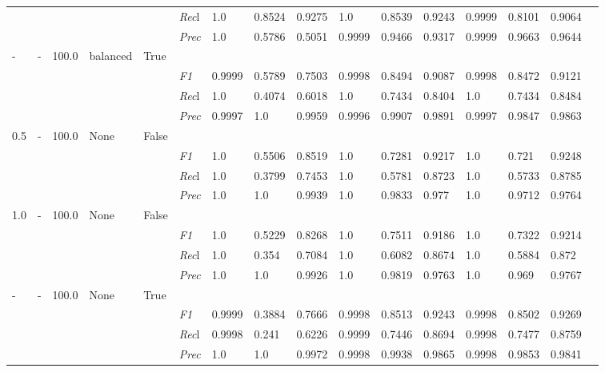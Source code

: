 \begin{table}[]
\begin{tabularx}{\textwidth}{XXXXX|X|XXX|XXX|XXXX}
& & & & & \textit{Rec}l & 1.0 & 0.8524 & 0.9275    & 1.0 & 0.8539    & 0.9243    & 0.9999    & 0.8101    & 0.9064    \\
& & & & & \textit{Prec} & 1.0 & 0.5786 & 0.5051 & 0.9999 & 0.9466 & 0.9317 & 0.9999 & 0.9663 & 0.9644 \\ \midrule
- & - & 100.0 & balanced & True& & & & & & & & & \\
& & & & & \textit{F1} & 0.9999 & 0.5789 & 0.7503 & 0.9998 & 0.8494        & 0.9087        & 0.9998        & 0.8472        & 0.9121        \\
& & & & & \textit{Rec}l & 1.0 & 0.4074 & 0.6018    & 1.0 & 0.7434    & 0.8404    & 1.0    & 0.7434    & 0.8484    \\
& & & & & \textit{Prec} & 0.9997 & 1.0 & 0.9959 & 0.9996 & 0.9907 & 0.9891 & 0.9997 & 0.9847 & 0.9863 \\ \midrule
0.5 & - & 100.0 & None & False& & & & & & & & & \\
& & & & & \textit{F1} & 1.0 & 0.5506 & 0.8519 & 1.0 & 0.7281        & 0.9217        & 1.0        & 0.721        & 0.9248        \\
& & & & & \textit{Rec}l & 1.0 & 0.3799 & 0.7453    & 1.0 & 0.5781    & 0.8723    & 1.0    & 0.5733    & 0.8785    \\
& & & & & \textit{Prec} & 1.0 & 1.0 & 0.9939 & 1.0 & 0.9833 & 0.977 & 1.0 & 0.9712 & 0.9764 \\ \midrule
1.0 & - & 100.0 & None & False& & & & & & & & & \\
& & & & & \textit{F1} & 1.0 & 0.5229 & 0.8268 & 1.0 & 0.7511        & 0.9186        & 1.0        & 0.7322        & 0.9214        \\
& & & & & \textit{Rec}l & 1.0 & 0.354 & 0.7084    & 1.0 & 0.6082    & 0.8674    & 1.0    & 0.5884    & 0.872    \\
& & & & & \textit{Prec} & 1.0 & 1.0 & 0.9926 & 1.0 & 0.9819 & 0.9763 & 1.0 & 0.969 & 0.9767 \\ \midrule
- & - & 100.0 & None & True& & & & & & & & & \\
& & & & & \textit{F1} & 0.9999 & 0.3884 & 0.7666 & 0.9998 & 0.8513        & 0.9243        & 0.9998        & 0.8502        & 0.9269        \\
& & & & & \textit{Rec}l & 0.9998 & 0.241 & 0.6226    & 0.9999 & 0.7446    & 0.8694    & 0.9998    & 0.7477    & 0.8759    \\
& & & & & \textit{Prec} & 1.0 & 1.0 & 0.9972 & 0.9998 & 0.9938 & 0.9865 & 0.9998 & 0.9853 & 0.9841 \\ \midrule

\end{tabularx}
\end{table}
